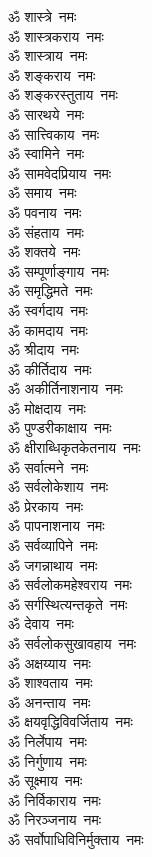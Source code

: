 \begin{multicols}{2}
\begin{flushleft}
ॐ शास्त्रे~नमः\\
ॐ शास्त्रकराय~नमः\\
ॐ शास्त्राय~नमः\\
ॐ शङ्कराय~नमः\\
ॐ शङ्करस्तुताय~नमः\\
ॐ सारथये~नमः\\
ॐ सात्त्विकाय~नमः\\
ॐ स्वामिने~नमः\\
ॐ सामवेदप्रियाय~नमः\hfill{}\\
ॐ समाय~नमः\\
ॐ पवनाय~नमः\\
ॐ संहताय~नमः\\
ॐ शक्तये~नमः\\
ॐ सम्पूर्णाङ्गाय~नमः\\
ॐ समृद्धिमते~नमः\\
ॐ स्वर्गदाय~नमः\\
ॐ कामदाय~नमः\\
ॐ श्रीदाय~नमः\\
ॐ कीर्तिदाय~नमः\hfill{}\\
ॐ अकीर्तिनाशनाय~नमः\\
ॐ मोक्षदाय~नमः\\
ॐ पुण्डरीकाक्षाय~नमः\\
ॐ क्षीराब्धिकृतकेतनाय~नमः\\
ॐ सर्वात्मने~नमः\\
ॐ सर्वलोकेशाय~नमः\\
ॐ प्रेरकाय~नमः\\
ॐ पापनाशनाय~नमः\\
ॐ सर्वव्यापिने~नमः\\
ॐ जगन्नाथाय~नमः\hfill{}\\
ॐ सर्वलोकमहेश्वराय~नमः\\
ॐ सर्गस्थित्यन्तकृते~नमः\\
ॐ देवाय~नमः\\
ॐ सर्वलोकसुखावहाय~नमः\\
ॐ अक्षय्याय~नमः\\
ॐ शाश्वताय~नमः\\
ॐ अनन्ताय~नमः\\
ॐ क्षयवृद्धिविवर्जिताय~नमः\\
ॐ निर्लेपाय~नमः\\
ॐ निर्गुणाय~नमः\hfill{}\\
ॐ सूक्ष्माय~नमः\\
ॐ निर्विकाराय~नमः\\
ॐ निरञ्जनाय~नमः\\
ॐ सर्वोपाधिविनिर्मुक्ताय~नमः\\

\end{flushleft}
\end{multicols}
